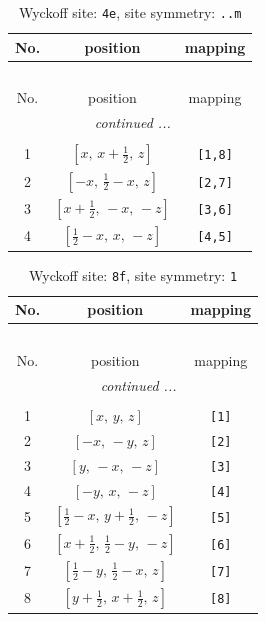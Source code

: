 \documentclass[fleqn,8pt]{jsarticle}
\begin{document}
\begin{longtable}{ccc}
\caption{Wyckoff site: {\tt 4e}, site symmetry: {\tt ..m}}
 \\
 \hline \hline
No. & position & mapping \\ \hline \endfirsthead

\multicolumn{2}{l}{\tablename\ \thetable{}} \\
 \hline \hline
No. & position & mapping \\ \hline \endhead

 \hline \hline
\multicolumn{2}{r}{\footnotesize\it continued ...} \\ \endfoot

 \hline \hline
\multicolumn{2}{r}{} \\ \endlastfoot

1 & $\left[ x,\, x + \frac{1}{2},\, z \right]$ & {\tt [1,8]} \\ \hline
2 & $\left[ - x,\, \frac{1}{2} - x,\, z \right]$ & {\tt [2,7]} \\ \hline
3 & $\left[ x + \frac{1}{2},\, - x,\, - z \right]$ & {\tt [3,6]} \\ \hline
4 & $\left[ \frac{1}{2} - x,\, x,\, - z \right]$ & {\tt [4,5]} \\
\end{longtable}
\renewcommand{\arraystretch}{1.2}
\begin{longtable}{ccc}
\caption{Wyckoff site: {\tt 8f}, site symmetry: {\tt 1}}
 \\
 \hline \hline
No. & position & mapping \\ \hline \endfirsthead

\multicolumn{2}{l}{\tablename\ \thetable{}} \\
 \hline \hline
No. & position & mapping \\ \hline \endhead

 \hline \hline
\multicolumn{2}{r}{\footnotesize\it continued ...} \\ \endfoot

 \hline \hline
\multicolumn{2}{r}{} \\ \endlastfoot

1 & $\left[ x,\, y,\, z \right]$ & {\tt [1]} \\ \hline
2 & $\left[ - x,\, - y,\, z \right]$ & {\tt [2]} \\ \hline
3 & $\left[ y,\, - x,\, - z \right]$ & {\tt [3]} \\ \hline
4 & $\left[ - y,\, x,\, - z \right]$ & {\tt [4]} \\ \hline
5 & $\left[ \frac{1}{2} - x,\, y + \frac{1}{2},\, - z \right]$ & {\tt [5]} \\ \hline
6 & $\left[ x + \frac{1}{2},\, \frac{1}{2} - y,\, - z \right]$ & {\tt [6]} \\ \hline
7 & $\left[ \frac{1}{2} - y,\, \frac{1}{2} - x,\, z \right]$ & {\tt [7]} \\ \hline
8 & $\left[ y + \frac{1}{2},\, x + \frac{1}{2},\, z \right]$ & {\tt [8]} \\
\end{longtable}
\end{document}
